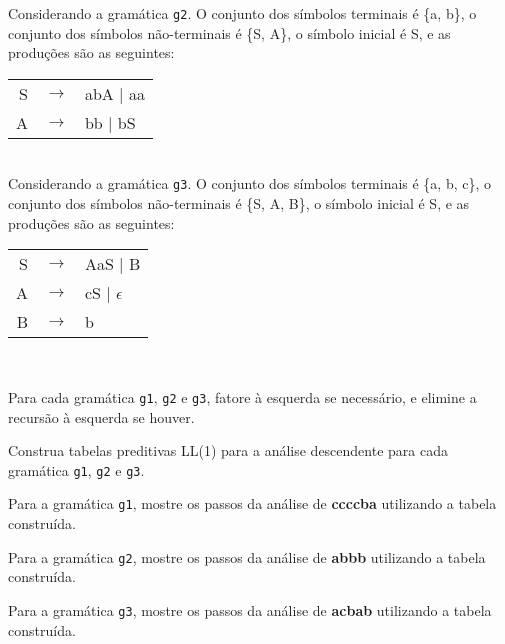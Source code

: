 \documentclass{compiladores}
\begin{document}
\begin{listanumerada}
  Considerando a gramática \texttt{g2}. O conjunto dos símbolos
  terminais é \{a, b\}, o conjunto dos símbolos não-terminais é \{S,
  A\}, o símbolo inicial é S, e as produções são as seguintes: \\
  \begin{tabular}{rcl}
    S & $\rightarrow$ & abA | aa \\
    A & $\rightarrow$ & bb | bS \\
  \end{tabular} \\
  Considerando a gramática \texttt{g3}. O conjunto dos símbolos
  terminais é \{a, b, c\}, o conjunto dos símbolos não-terminais é
  \{S, A, B\}, o símbolo inicial é S, e as produções são as seguintes:
  \\
  \begin{tabular}{rcl}
    S & $\rightarrow$ & AaS | B \\
    A & $\rightarrow$ & cS | $\epsilon$ \\
    B & $\rightarrow$ & b \\
  \end{tabular} \\

  \begin{lista}
    \item Para cada gramática \texttt{g1}, \texttt{g2} e \texttt{g3},
      fatore à esquerda se necessário, e elimine a recursão à esquerda
      se houver.
    \item Construa tabelas preditivas LL(1) para a análise descendente
      para cada gramática \texttt{g1}, \texttt{g2} e \texttt{g3}.
    \item Para a gramática \texttt{g1}, mostre os passos da análise de
      {\bf ccccba} utilizando a tabela construída.
    \item Para a gramática \texttt{g2}, mostre os passos da análise de
      {\bf abbb} utilizando a tabela construída.
    \item Para a gramática \texttt{g3}, mostre os passos da análise de
      {\bf acbab} utilizando a tabela construída.
  \end{lista}


\end{listanumerada}
\end{document}
